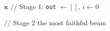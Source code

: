 \begin{algorithm}[h]
\caption{Haystack Sampling}
\label{algo-haystack-sampling}
\begin{algorithmic}[1]
\Require $\mathbf{x}$
\State // Stage 1:
\State \texttt{out} $\gets []$, $i \gets 0$

\State // Stage 2
\State \Return the most faithful beam
\end{algorithmic}
\end{algorithm}
